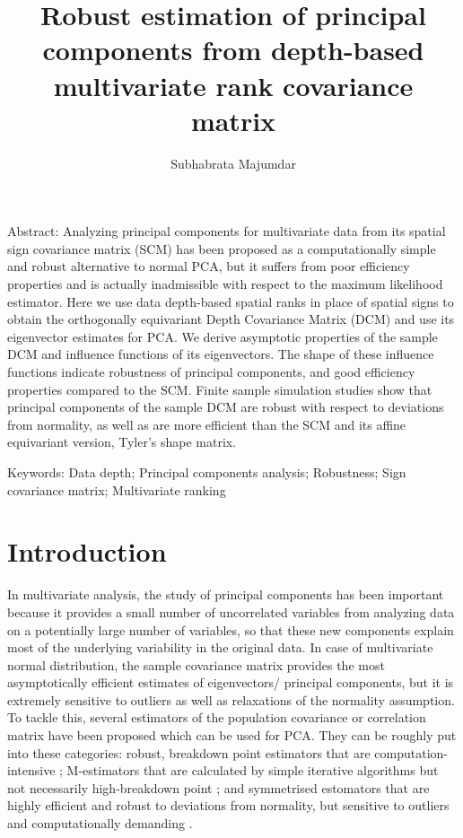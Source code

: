 \documentclass[fleqn,11pt]{article}
\begin{document}
\newtheorem{Theorem}{Theorem}[section]
\newtheorem{Lemma}[Theorem]{Lemma}
\newtheorem{Corollary}[Theorem]{Corollary}
\theoremstyle{definition} \newtheorem{Definition}[Theorem]{Definition}

\title{Robust estimation of principal components from depth-based multivariate rank covariance matrix}
\date{}
\author{Subhabrata Majumdar}
\maketitle

Abstract:
Analyzing principal components for multivariate data from its spatial sign covariance matrix (SCM) has been proposed as a computationally simple and robust alternative to normal PCA, but it suffers from poor efficiency properties and is actually inadmissible with respect to the maximum likelihood estimator. Here we use data depth-based spatial ranks in place of spatial signs to obtain the orthogonally equivariant Depth Covariance Matrix (DCM) and use its eigenvector estimates for PCA. We derive asymptotic properties of the sample DCM and influence functions of its eigenvectors. The shape of these influence functions indicate robustness of principal components, and good efficiency properties compared to the SCM. Finite sample simulation studies show that principal components of the sample DCM are robust with respect to deviations from normality, as well as are more efficient than the SCM and its affine equivariant version, Tyler's shape matrix.
\vspace{.5cm}

Keywords:
Data depth; Principal components analysis; Robustness; Sign covariance matrix; Multivariate ranking

\newpage
\section{Introduction}
In multivariate analysis, the study of principal components has been important because it provides a small number of uncorrelated variables from analyzing data on a potentially large number of variables, so that these new components explain most of the underlying variability in the original data. In case of multivariate normal distribution, the sample covariance matrix provides the most asymptotically efficient estimates of eigenvectors/ principal components, but it is extremely sensitive to outliers as well as relaxations of the normality assumption. To tackle this, several estimators of the population covariance or correlation matrix have been proposed which can be used for PCA. They can be roughly put into these categories: robust, breakdown point estimators that are computation-intensive \citep{rousseeuw85, maronna76}; M-estimators that are calculated by simple iterative algorithms but not necessarily high-breakdown point \citep{huber77, tyler87}; and symmetrised estomators that are highly efficient and robust to deviations from normality, but sensitive to outliers and computationally demanding \citep{dumbgen98, sirkia07}.
\end{document}
